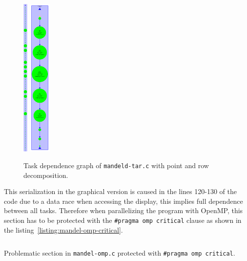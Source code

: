 \begin{figure}[H]
\centering
\includegraphics[height=8cm]{plots/dependency_graph_mandeld_point.png}
\hspace{5em}
\includegraphics[height=8cm]{plots/dependency_graph_mandeld_row.pdf}
\caption{Task dependence graph of \texttt{mandeld-tar.c} with point and row decomposition.}
\label{graph:mandeld_point_and_row}
\end{figure}

\pagebreak

This serialization in the graphical version is caused in the lines 120-130 of the code due to a data race when accessing the display, this implies full dependence between all tasks. Therefore when parallelizing the program with OpenMP, this section has to be protected with the \texttt{\#pragma omp critical} clause as shown in the listing~\ref{listing:mandel-omp-critical}.

\begin{listing}[H]
\inputminted[firstline=120,lastline=130]{c}{sources/mandel-omp-v1.c}
\caption{Problematic section in \texttt{mandel-omp.c} protected with \texttt{\#pragma omp critical}.}
\label{listing:mandel-omp-critical}
\end{listing}

